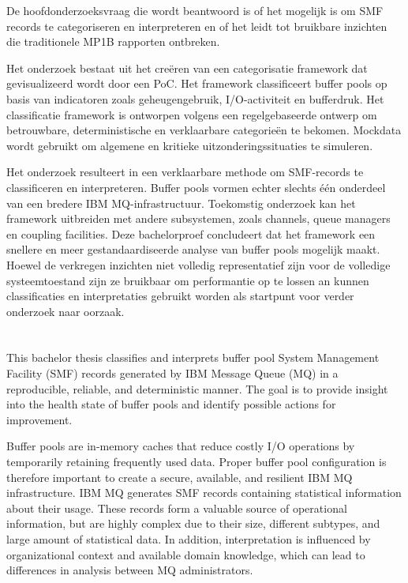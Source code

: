 De hoofdonderzoeksvraag die wordt beantwoord is of het mogelijk is om SMF records te categoriseren en interpreteren en of het leidt tot 
bruikbare inzichten die traditionele MP1B rapporten ontbreken. 

Het onderzoek bestaat uit het creëren van een categorisatie framework dat gevisualizeerd wordt door een PoC. 
Het framework classificeert buffer pools op basis van indicatoren zoals geheugengebruik, I/O-activiteit en bufferdruk. Het classificatie framework is ontworpen volgens een regelgebaseerde ontwerp om betrouwbare, deterministische en verklaarbare categorieën te bekomen. 
Mockdata wordt gebruikt om algemene en kritieke uitzonderingssituaties te simuleren. 

Het onderzoek resulteert in een verklaarbare methode om SMF-records te classificeren en interpreteren. 
Buffer pools vormen echter slechts één onderdeel van een bredere IBM MQ-infrastructuur. Toekomstig onderzoek kan het framework uitbreiden met andere subsystemen, zoals channels, queue managers en coupling facilities.
Deze bachelorproef concludeert dat het framework een snellere en meer gestandaardiseerde analyse van buffer pools mogelijk maakt. Hoewel de verkregen inzichten niet volledig representatief zijn voor de volledige systeemtoestand zijn ze bruikbaar om performantie op te lossen an 
kunnen classificaties en interpretaties gebruikt worden als startpunt voor verder onderzoek naar oorzaak.




\chapter*{}

This bachelor thesis classifies and interprets buffer pool System Management Facility (SMF) records generated by IBM Message Queue (MQ) in a reproducible,
reliable, and deterministic manner. The goal is to provide insight into the health state of buffer pools and identify possible actions for improvement.

Buffer pools are in-memory caches that reduce costly I/O operations by temporarily retaining frequently used data. Proper buffer pool configuration is therefore important to
create a secure, available, and resilient IBM MQ infrastructure. IBM MQ generates SMF records containing statistical information about their usage. 
These records form a valuable source of operational information, but are highly complex due to their size, different subtypes, and large amount of statistical data.
In addition, interpretation is influenced by organizational context and available domain knowledge, which can lead to differences in analysis between MQ administrators.

